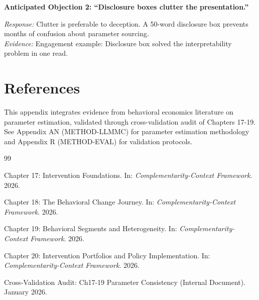 \begin{table}[htbp]
\textbf{Anticipated Objection 2: ``Disclosure boxes clutter the presentation.''}
\begin{itemize}[nosep]
\textit{Response:} Clutter is preferable to deception. A 50-word disclosure box prevents months of confusion about parameter sourcing.
\\ \textit{Evidence:} Engagement example: Disclosure box solved the interpretability problem in one read.
\end{itemize}


\section{References}
\label{sec:jjj-references}

This appendix integrates evidence from behavioral economics literature on parameter estimation, validated through cross-validation audit of Chapters 17-19. See Appendix AN (METHOD-LLMMC) for parameter estimation methodology and Appendix R (METHOD-EVAL) for validation protocols.

\nocite{bcm_master}

\begin{thebibliography}{99}

Chapter 17: Intervention Foundations. In: \textit{Complementarity-Context Framework}. 2026.

Chapter 18: The Behavioral Change Journey. In: \textit{Complementarity-Context Framework}. 2026.

Chapter 19: Behavioral Segments and Heterogeneity. In: \textit{Complementarity-Context Framework}. 2026.

Chapter 20: Intervention Portfolios and Policy Implementation. In: \textit{Complementarity-Context Framework}. 2026.

Cross-Validation Audit: Ch17-19 Parameter Consistency (Internal Document). January 2026.

\end{thebibliography}


\vspace{1cm}
\noindent \hrulefill


\end{table}
